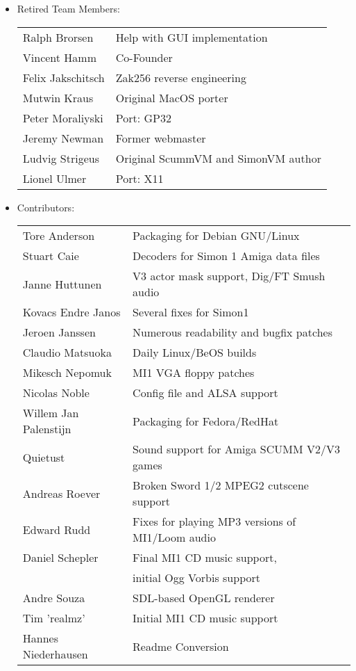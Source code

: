 \begin{itemize}
\item Retired Team Members:\\
  \begin{tabular}[h]{p{4cm}l}
    Ralph Brorsen        & Help with GUI implementation\\
    Vincent Hamm         & Co-Founder\\
    Felix Jakschitsch    & Zak256 reverse engineering\\
    Mutwin Kraus         & Original MacOS porter\\
    Peter Moraliyski     & Port: GP32\\
    Jeremy Newman        & Former webmaster\\
    Ludvig Strigeus      & Original ScummVM and SimonVM author\\
    Lionel Ulmer         & Port: X11\\
  \end{tabular}
\item Contributors:\\
  \begin{tabular}{p{4cm}l}
    Tore Anderson        & Packaging for Debian GNU/Linux\\
    Stuart Caie          & Decoders for Simon 1 Amiga data files\\
    Janne Huttunen       & V3 actor mask support, Dig/FT Smush audio\\
    Kovacs Endre Janos   & Several fixes for Simon1\\
    Jeroen Janssen       & Numerous readability and bugfix patches\\
    Claudio Matsuoka     & Daily Linux/BeOS builds \\
    Mikesch Nepomuk      & MI1 VGA floppy patches\\
    Nicolas Noble        & Config file and ALSA support\\
    Willem Jan Palenstijn& Packaging for Fedora/RedHat\\
    Quietust             & Sound support for Amiga SCUMM V2/V3 games\\
    Andreas Roever       & Broken Sword 1/2 MPEG2 cutscene support\\
    Edward Rudd          & Fixes for playing MP3 versions of MI1/Loom audio\\
    Daniel Schepler      & Final MI1 CD music support, \\
                         & initial Ogg Vorbis support\\
    Andre Souza          & SDL-based OpenGL renderer\\
    Tim 'realmz'         & Initial MI1 CD music support\\
    Hannes Niederhausen  & Readme Conversion\\
  \end{tabular}
  

\end{itemize}
